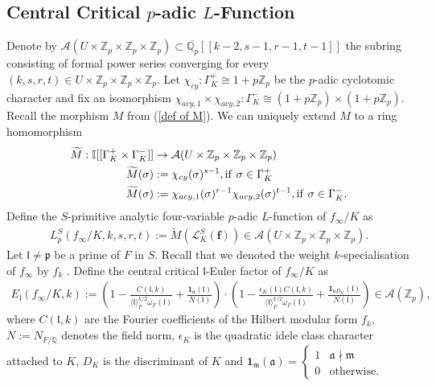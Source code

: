 \documentclass[reqno,10pt]{amsart}
\newcommand{\zp}{\mathbb{Z}_{p}}
\newcommand{\qp}{\mathbb{Q}_{p}}
\newcommand{\q}{\mathbb{Q}}
\newcommand{\I}{\mathbb{I}}
\newcommand{\f}{\mathbf{f}}
\theoremstyle{plain}
\theoremstyle{definition}
\begin{document}
\subsection{Central Critical $p$-adic $L$-Function} \label{Central Critical Def}
Denote by $\mathcal{A}(U \times \zp \times \zp \times \zp) \subset \overline{\qp}[[k-2,s-1,r-1,t-1]]$ the subring consisting of formal power series converging for every $(k,s,r,t) \in U \times \zp \times \zp \times \zp$. Let $\chi_{cy} : \Gamma_K^+ \cong 1+p\zp$ be the $p$-adic cyclotomic character and fix an isomorphism $\chi_{acy,1} \times \chi_{acy,2} : \Gamma_K^- \cong (1+p\zp) \times (1+p\zp)$. Recall the morphism $M$ from (\ref{def of M}). We can uniquely extend $M$ to a ring homomorphism
\begin{align*}
    \widetilde{M} : \I[[\Gamma_K^+ \times \Gamma_K^-]] & \rightarrow \mathcal{A}(U \times \zp \times \zp \times \zp) \\ 
    \widetilde{M}(\sigma) & := \chi_{cy}(\sigma)^{s-1}, \text{if} \hspace{1.5mm} \sigma \in \Gamma_K^+ \\
    \widetilde{M}(\sigma) & := \chi_{acy,1}(\sigma)^{r-1}\chi_{acy,2}(\sigma)^{t-1}, \text{if} \hspace{1.5mm} \sigma \in \Gamma_K^-.
\end{align*}
Define the $S$-primitive analytic four-variable $p$-adic $L$-function of $f_\infty/K$ as
\begin{align*}
   L_p^S(f_\infty/K,k,s,r,t) := \widetilde{M}(\mathcal{L}_K^S(\f)) \in \mathcal{A}(U \times \zp \times \zp \times \zp).
\end{align*}
Let $\mathfrak{l} \neq \mathfrak{p}$ be a prime of $F$ in $S$. Recall that we denoted the weight $k$-specialisation of $f_\infty$ by $f_k$ . Define the central critical $\mathfrak{l}$-Euler factor of $f_\infty/K$ as
\begin{align*}
    E_{\mathfrak{l}}(f_\infty/K,k) := \left(1 - \frac{C(\mathfrak{l},k)}{\langle \mathfrak{l} \rangle_F^{k/2} \omega_F(\mathfrak{l})} + \frac{\mathbf{1}_\mathfrak{n}(\mathfrak{l})}{N(\mathfrak{l})} \right) \cdot \left(1 - \frac{\epsilon_K(\mathfrak{l})C(\mathfrak{l},k)}{\langle \mathfrak{l} \rangle_F^{k/2} \omega_F(\mathfrak{l})} + \frac{\mathbf{1}_{\mathfrak{n}D_K}(\mathfrak{l})}{N(\mathfrak{l})} \right) \in \mathcal{A}(\zp),
\end{align*}
where $C(\mathfrak{l},k)$ are the Fourier coefficients of the Hilbert modular form $f_k$, $N := N_{F/\q}$ denotes the field norm, $\epsilon_K$ is the quadratic idele class character attached to $K$, $D_K$ is the discriminant of $K$ and $\mathbf{1}_\mathfrak{m}(\mathfrak{a}) = \begin{cases}
    1 & \mathfrak{a} \nmid \mathfrak{m} \\
    0 & \text{otherwise}.
\end{cases}$
\end{document}
